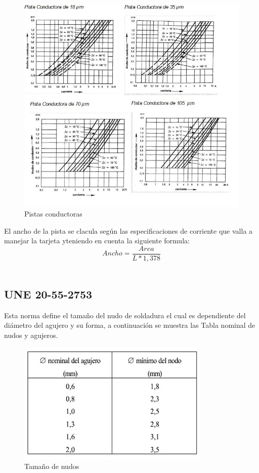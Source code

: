\documentclass[a4paper,12pt,twoside]{proyectotanquesecci}
\begin{document}
\begin{figure}[h]
\centering
\includegraphics[scale=0.8]{pistas.jpg}
\renewcommand{\figurename}{Fig.}
\caption{Pistas conductoras}
\label{Pistas conductoras}
\end{figure}

El ancho de la pista se clacula según las especificaciones de corriente que valla a manejar la tarjeta yteniendo en cuenta la siguiente formula:
\begin{equation}
Ancho=\frac{Area}{L*1,378}
\label{Ecu 2}
\end{equation}
\\

\subsection{UNE 20-55-2753}
Esta norma define el tamaño del nudo de soldadura el cual es dependiente del  diámetro del agujero  y su forma, a continuación se muestra las Tabla nominal de nudos y agujeros.

\begin{figure}[h]
\centering
\includegraphics[scale=0.8]{Tabla2.jpg}
\renewcommand{\figurename}{Fig.}
\caption{Tamaño de nudos}
\label{Tamaño de nudos}
\end{figure}
\end{document}

